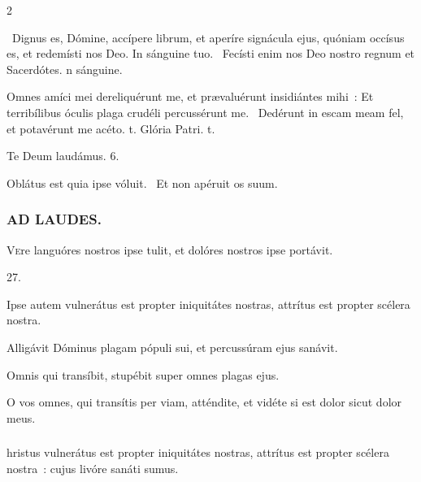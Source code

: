 \documentclass[9pt,twoside]{extarticle}
\begin{document}
\begin{multicols}{2}
\begin{tightlist}{}
\item {}~Dignus es, Dómine, accípere librum, et aperíre signácula ejus, quóniam occísus es, et redemísti nos Deo. \textred{*} In sánguine tuo. ~Fecísti enim nos Deo nostro regnum et Sacerdótes. n sánguine.
\item {}
\item {} Omnes amíci mei dereliquérunt me, et prævaluérunt insidiántes mihi~: \textred{*} Et terribílibus óculis plaga crudéli percussérunt me. ~Dedérunt in escam meam fel, et potavérunt me acéto. t. Glória Patri. t.
\item Te Deum laudámus. 6.
\item {} Oblátus est quia ipse vóluit. ~Et non apéruit os suum.
\end{tightlist}

\subsubsection*{\center \textsc{AD LAUDES.}}
\begin{center}\end{center}
\lettrine{V}ere languóres nostros ipse tulit, et dolóres nostros ipse portávit.

\begin{tightlist}{}
\item {} 27.
\item {} Ipse autem vulnerátus est propter iniquitátes nostras, attrítus est propter scélera nostra.
\item {} Alligávit Dóminus plagam pópuli sui, et percussúram ejus sanávit.
\item {} Omnis qui transíbit, stupébit super omnes plagas ejus.
\item {} O vos omnes, qui transítis per viam, atténdite, et vidéte si est dolor sicut dolor meus.
\end{tightlist}

\subsubsection*{}
hristus vulnerátus est propter iniquitátes nostras, attrítus est propter scélera nostra~: cujus livóre sanáti sumus.


\end{multicols}
\end{document}
